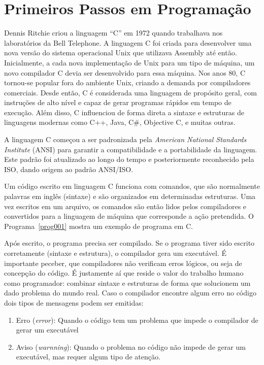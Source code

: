 \documentclass[11pt,fleqn]{book} %
\begin{document}
\newpage
\section{Primeiros Passos em Programação}\label{disc:primeirospassos}

Dennis Ritchie criou a linguagem ``C'' em 1972 quando trabalhava nos laboratórios da Bell Telephone.
A linguagem C foi criada para desenvolver uma nova versão do sistema operacional Unix que utilizava Assembly até então.
Inicialmente, a cada nova implementação de Unix para um tipo de máquina, um novo compilador C devia ser desenvolvido para essa máquina.
Nos anos 80, C tornou-se popular fora do ambiente Unix, criando a demanda por compiladores comerciais.
Desde então, C é considerada uma linguagem de propósito geral, com instruções de alto nível e capaz de gerar programas rápidos em tempo de execução.
Além disso, C influenciou de forma direta a sintaxe e estruturas de linguagens modernas como C++, Java, C\#, Objective C, e muitas outras.

A linguagem C começou a ser padronizada pela \textit{American National Standards Institute} (ANSI) para garantir a compatibilidade e a portabilidade da linguagem.
Este padrão foi atualizado ao longo do tempo e posteriormente reconhecido pela ISO, dando origem ao padrão ANSI/ISO.

Um código escrito em linguagem C funciona com comandos, que são normalmente palavras em inglês (sintaxe) e são organizados em determinadas estruturas.
Uma vez escritos em um arquivo, os comandos são então lidos pelos compiladores e convertidos para a linguagem de máquina que corresponde a ação pretendida.
O Programa~\ref{prog001} mostra um exemplo de programa em C.



Após escrito, o programa precisa ser compilado. 
Se o programa tiver sido escrito corretamente (sintaxe e estrutura), o compilador gera um executável.
É importante peceber, que compiladores não verificam erros lógicos, ou seja de concepção do código.
É justamente aí que reside o valor do trabalho humano como programador: combinar sintaxe e estruturas de forma que solucionem um dado problema do mundo real.
Caso o compilador encontre algum erro no código dois tipos de mensagens podem ser emitidas:
\begin{enumerate}
	\item Erro (\textit{error}): Quando o código tem um problema que impede o compilador de gerar um executável
	\item Aviso (\textit{warnning}): Quando o problema no código não impede de gerar um executável, mas requer algum tipo de atenção.
\end{enumerate}
\end{document}
